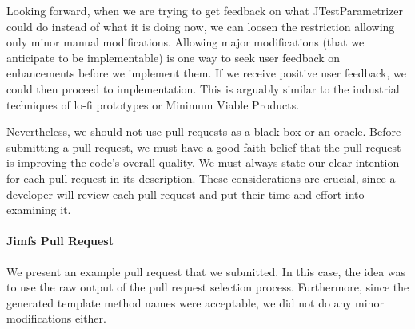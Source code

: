 Looking forward, when we are trying to get feedback on what JTestParametrizer could do instead of what it is doing now, we can loosen the restriction allowing only minor manual modifications. Allowing major modifications (that we anticipate to be implementable) is one way to seek user feedback on enhancements before we implement them. If we receive positive user feedback, we could then proceed to implementation. This is arguably similar to the industrial techniques of lo-fi prototypes or Minimum Viable Products.





Nevertheless, we should not use pull requests as a black box or an oracle. Before submitting a pull request, we must have a good-faith belief that the pull request is improving the code's overall quality. We must always state our clear intention for each pull request in its description. These considerations are crucial, since a developer will review each pull request and put their time and effort into examining it. 

\paragraph{Jimfs Pull Request}
We present an example pull request that we submitted. In this case, the idea was to use the raw output of the pull request selection process. Furthermore, since the generated template method names were acceptable, we did not do any minor modifications either.

